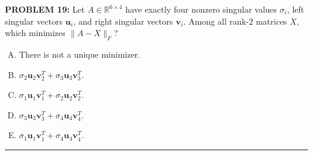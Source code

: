 \documentclass[12pt]{amsart}
\newcommand{\divider}{
  \vspace{-1em} %
  \noindent
  \raisebox{-0.15ex}{\textbullet}%
  \hspace{0.5em}%
  \rule[0.5ex]{0.95\textwidth}{1.0pt}%
  \hspace{0.5em}%
  \raisebox{-0.15ex}{\textbullet}%
  \vspace{0em} %
}
\begin{document}
{\bf PROBLEM 19:}
Let $A \in \mathbb{R}^{6 \times 4}$ have exactly four nonzero singular values
$\sigma_i$, left singular vectors $\mathbf{u}_i$,
and right singular vectors $\mathbf{v}_i$. Among all rank-$2$ matrices $X$,
which minimizes $\|A - X\|_F$?
\begin{enumerate}[(A)]
\item There is not a unique minimizer.
\item $\sigma_2\mathbf{u}_2\mathbf{v}_2^T + \sigma_3\mathbf{u}_3\mathbf{v}_3^T$.
\item $\sigma_1\mathbf{u}_1\mathbf{v}_1^T + \sigma_2\mathbf{u}_2\mathbf{v}_2^T$.
\item $\sigma_3\mathbf{u}_3\mathbf{v}_3^T + \sigma_4\mathbf{u}_4\mathbf{v}_4^T$.
\item $\sigma_1\mathbf{u}_1\mathbf{v}_1^T + \sigma_4\mathbf{u}_4\mathbf{v}_4^T$.
\end{enumerate}
%
\divider

\newpage 
\end{document}
